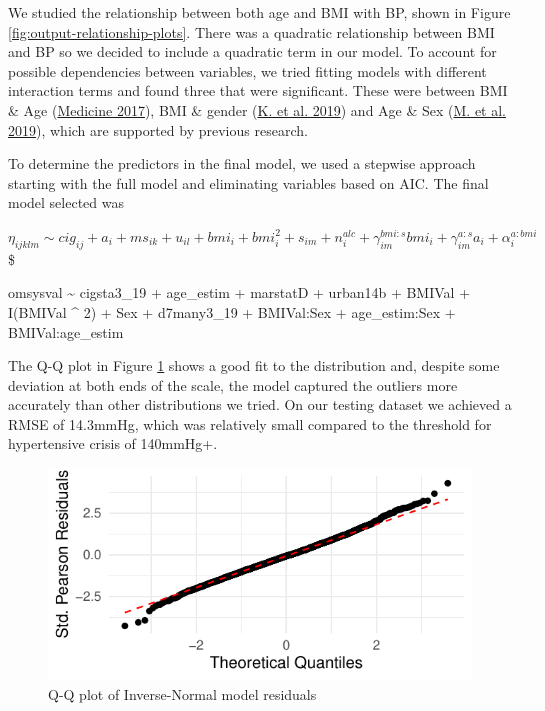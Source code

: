 \documentclass[
  11pt,
  twocolumn]{article}
\begin{document}
We studied the relationship between both age and BMI with BP, shown in
Figure \ref{fig:output-relationship-plots}. There was a quadratic
relationship between BMI and BP so we decided to include a quadratic
term in our model. To account for possible dependencies between
variables, we tried fitting models with different interaction terms and
found three that were significant. These were between BMI \& Age
(\protect\hyperlink{ref-AgeBMI}{Medicine 2017}), BMI \& gender
(\protect\hyperlink{ref-SexBMI}{K. et al. 2019}) and Age \& Sex
(\protect\hyperlink{ref-AgeSex}{M. et al. 2019}), which are supported by
previous research.

To determine the predictors in the final model, we used a stepwise
approach starting with the full model and eliminating variables based on
AIC. The final model selected was

\(\eta_{ijklm} \sim cig_{ij} + a_i + ms_{ik} + u_{il} + bmi_i + bmi_i^2 + s_{im} + n_i^{alc} + \gamma_{im}^{bmi:s}bmi_i + \gamma_{im}^{a:s}a_i + \alpha_i^{a:bmi}\)\$

omsysval \textasciitilde{} cigsta3\_19 + age\_estim + marstatD +
urban14b + BMIVal + I(BMIVal \^{} 2) + Sex + d7many3\_19 + BMIVal:Sex +
age\_estim:Sex + BMIVal:age\_estim

The Q-Q plot in Figure \ref{fig:output-qq-plot} shows a good fit to the
distribution and, despite some deviation at both ends of the scale, the
model captured the outliers more accurately than other distributions we
tried. On our testing dataset we achieved a RMSE of 14.3mmHg, which was
relatively small compared to the threshold for hypertensive crisis of
140mmHg+.

\begin{figure}[H]

{\centering \includegraphics{Coursework_files/figure-latex/output-qq-plot-1} 

}

\caption{Q-Q plot of Inverse-Normal model residuals}\label{fig:output-qq-plot}
\end{figure}
\end{document}

